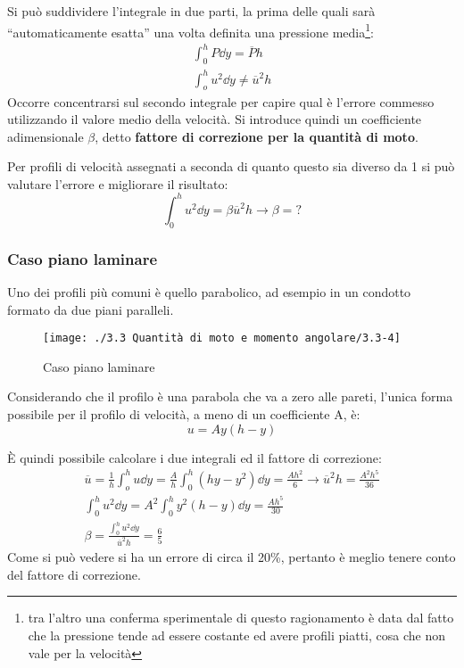 Si può suddividere l'integrale in due parti, la prima delle quali sarà ``automaticamente esatta'' una volta definita una pressione media\footnote{tra l'altro una conferma sperimentale di questo ragionamento è data dal fatto che la pressione tende ad essere costante ed avere profili piatti, cosa che non vale per la velocità}:
%
	\begin{equation*}
		\begin{gathered}
			\int_0^h P \dd{y} = \overline{P} h \\
			\int_o^h u^2 \dd{y} \neq \overline{u}^2 h
		\end{gathered}
	\end{equation*}
%
Occorre concentrarsi sul secondo integrale per capire qual è l'errore commesso utilizzando il valore medio della velocità. 
Si introduce quindi un coefficiente adimensionale $\beta$, detto \textbf{fattore di correzione per la quantità di moto}.

Per profili di velocità assegnati a seconda di quanto questo sia diverso da 1 si può valutare l'errore e migliorare il risultato:
%
	\begin{equation*}
		\int_0^h u^2 \dd{y} = \beta \overline{u}^2 h \rightarrow \beta = ?
	\end{equation*}
%
	
\subsubsection{Caso piano laminare}
Uno dei profili più comuni è quello parabolico, ad esempio in un condotto formato da due piani paralleli.
%
	\begin{figure}[ht]
		\texttt{[image: ./3.3 Quantità di moto e momento angolare/3.3-4]}
		\centering
		\caption{Caso piano laminare}
	\end{figure}
%
Considerando che il profilo è una parabola che va a zero alle pareti, l'unica forma possibile per il profilo di velocità, a meno di un coefficiente A, è:
%
	\begin{equation*}
		u = A y (h - y)
	\end{equation*}
%

È quindi possibile calcolare i due integrali ed il fattore di correzione:
%
	\begin{equation*}
		\begin{gathered}
			\overline{u} = \frac{1}{h} \int_o^h u \dd{y}  = \frac{A}{h} \int_0^h (h y - y^2) \dd{y} = \frac{A h^2}{6} \rightarrow \overline{u}^2 h = \frac{A^2 h^5}{36} \\
			\int_0^h u^2 \dd{y} = A^2 \int_0^h y^2 (h - y) \dd{y} = \frac{A h^5}{30} \\
			\beta =  \frac{\int_0^h u^2 \dd{y}}{\overline{u}^2 h} = \frac{6}{5}
		\end{gathered}
	\end{equation*}
%
Come si può vedere si ha un errore di circa il 20\%, pertanto è meglio tenere conto del fattore di correzione.

